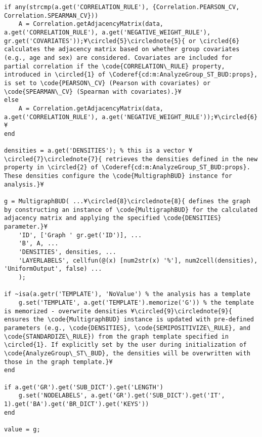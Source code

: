 \documentclass{tufte-handout}
\begin{document}
\begin{lstlisting}
if any(strcmp(a.get('CORRELATION_RULE'), {Correlation.PEARSON_CV, Correlation.SPEARMAN_CV}))
	A = Correlation.getAdjacencyMatrix(data, a.get('CORRELATION_RULE'), a.get('NEGATIVE_WEIGHT_RULE'), gr.get('COVARIATES'));¥\circled{5}\circlednote{5}{ or \circled{6} calculates the adjacency matrix based on whether group covariates (e.g., age and sex) are considered. Covariates are included for partial correlation if the \code{CORRELATION\_RULE} property, introduced in \circled{1} of \Coderef{cd:m:AnalyzeGroup_ST_BUD:props}, is set to \code{PEARSON\_CV} (Pearson with covariates) or \code{SPEARMAN\_CV} (Spearman with covariates).}¥
else
    A = Correlation.getAdjacencyMatrix(data, a.get('CORRELATION_RULE'), a.get('NEGATIVE_WEIGHT_RULE'));¥\circled{6}¥
end

densities = a.get('DENSITIES'); % this is a vector ¥\circled{7}\circlednote{7}{ retrieves the densities defined in the new property in \circled{2} of \Coderef{cd:m:AnalyzeGroup_ST_BUD:props}. These densities configure the \code{MultigraphBUD} instance for analysis.}¥

g = MultigraphBUD( ...¥\circled{8}\circlednote{8}{ defines the graph by constructing an instance of \code{MultigraphBUD} for the calculated adjacency matrix and applying the specified \code{DENSITIES} parameter.}¥
    'ID', ['Graph ' gr.get('ID')], ...
    'B', A, ...
    'DENSITIES', densities, ... 
    'LAYERLABELS', cellfun(@(x) [num2str(x) '%'], num2cell(densities), 'UniformOutput', false) ...
    );

if ~isa(a.getr('TEMPLATE'), 'NoValue') % the analysis has a template
    g.set('TEMPLATE', a.get('TEMPLATE').memorize('G')) % the template is memorized - overwrite densities ¥\circled{9}\circlednote{9}{ ensures the \code{MultigraphBUD} instance is updated with pre-defined parameters (e.g., \code{DENSITIES}, \code{SEMIPOSITIVIZE\_RULE}, and \code{STANDARDIZE\_RULE}) from the graph template specified in \circled{1}. If explicitly set by the user during initialization of \code{AnalyzeGroup\_ST\_BUD}, the densities will be overwritten with those in the graph template.}¥
end

if a.get('GR').get('SUB_DICT').get('LENGTH')
    g.set('NODELABELS', a.get('GR').get('SUB_DICT').get('IT', 1).get('BA').get('BR_DICT').get('KEYS'))
end

value = g;
\end{lstlisting}
\end{document}
